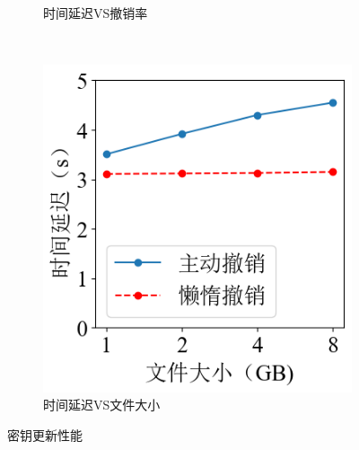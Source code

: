 \documentclass[promaster]{thesis-uestc}
\begin{document}
\begin{figure}[h]
\begin{subfigure}{0.40\textwidth}
        \centering
        \captionsetup{width=\textwidth}
        \caption{时间延迟VS撤销率}
        \label{密钥更新性能2}
    \end{subfigure}\\
    \begin{subfigure}{0.40\textwidth}
        \includegraphics[width=1\linewidth]{pic/file_size.png}
        \centering
        \captionsetup{width=\textwidth}
        \caption{时间延迟VS文件大小}
        \label{密钥更新性能3}
    \end{subfigure}
    \caption{密钥更新性能}
    \label{密钥更新性能}
\end{figure}
\end{document}
